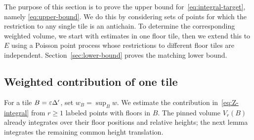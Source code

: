 \documentclass[11pt,letterpaper]{article}
\begin{document}
The purpose of this section is to prove the upper bound for~\eqref{eq:integral-target}, namely \eqref{eq:upper-bound}. We do this by considering sets of points for which the restriction to any single tile is an antichain. To determine the corresponding weighted volume, we start with estimates in one floor tile, then we extend this to $E$ using a Poisson point process whose restrictions to different floor tiles are independent. Section~\ref{sec:lower-bound} proves the matching lower bound.

\subsection{Weighted contribution of one tile}
For a tile $B=\varepsilon\Delta'$, set $w_B=\sup_Bw$. We estimate the contribution in~\eqref{eq:Z-integral} from $r\ge1$ labeled points with floors in $B$. The pinned volume $V_r(B)$ already integrates over their floor positions and relative heights; the next lemma integrates the remaining common height translation.
\end{document}
